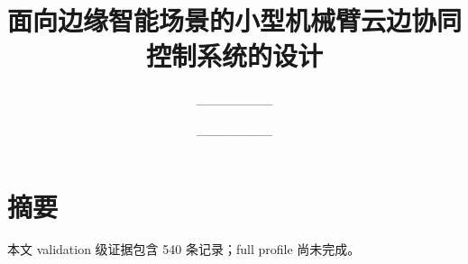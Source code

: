 \documentclass[UTF8]{ctexbook}
\title{面向边缘智能场景的小型机械臂云边协同控制系统的设计}
\author{________}
\date{________}
\begin{document}
\maketitle
\chapter*{摘要}
本文 validation 级证据包含 540 条记录；full profile 尚未完成。















\end{document}
